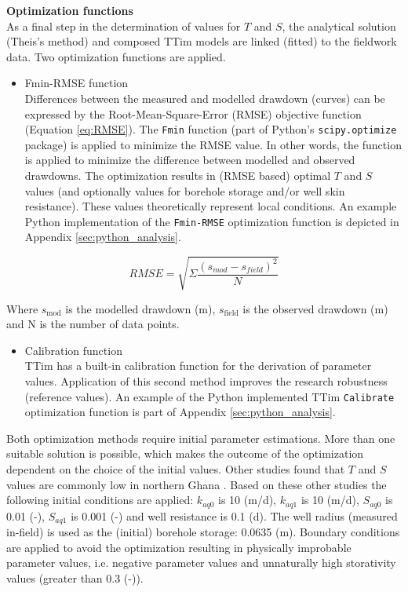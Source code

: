 \textbf{Optimization functions} \\
As a final step in the determination of values for $T$ and $S$, the analytical solution (Theis's method) and composed TTim models are linked (fitted) to the fieldwork data. Two optimization functions are applied.

\begin{itemize}
\item{Fmin-RMSE function} \\
Differences between the measured and modelled drawdown (curves) can be expressed by the Root-Mean-Square-Error (RMSE) objective function (Equation \ref{eq:RMSE}). The \texttt{Fmin} function (part of Python's \texttt{scipy.optimize} package) is applied to minimize the RMSE value. In other words, the function is applied to minimize the difference between modelled and observed drawdowns. The optimization results in (RMSE based) optimal $T$ and $S$ values (and optionally values for borehole storage and/or well skin resistance). These values theoretically represent local conditions. An example Python implementation of the \texttt{Fmin-RMSE} optimization function is depicted in Appendix \ref{sec:python_analysis}. 
\end{itemize}

\begin{equation}
\label{eq:RMSE}
 RMSE = \sqrt{\Sigma\frac{(s_{mod}-s_{field})^{2}}{N}}
\end{equation}

Where $s_{\text{mod}}$ is the modelled drawdown (m), $s_{\text{field}}$ is the observed drawdown (m) and N is the number of data points. \\
 
\begin{itemize}
\item{Calibration function} \\
TTim has a built-in calibration function for the derivation of parameter values. Application of this second method improves the research robustness (reference values). An example of the Python implemented TTim \texttt{Calibrate} optimization function is part of Appendix \ref{sec:python_analysis}. \\
\end{itemize}

Both optimization methods require initial parameter estimations. More than one suitable solution is possible, which makes the outcome of the optimization dependent on the choice of the initial values. Other studies found that $T$ and $S$ values are commonly low in northern Ghana \citep[e.g.][]{Owusu2015,Owusu2017}. Based on these other studies the following initial conditions are applied: $k_{aq0}$ is 10 (m/d), $k_{aq1}$ is 10 (m/d), $S_{aq0}$ is 0.01 (-), $S_{aq1}$ is 0.001 (-) and well resistance is 0.1 (d). The well radius (measured in-field) is used as the (initial) borehole storage: 0.0635 (m). Boundary conditions are applied to avoid the optimization resulting in physically improbable parameter values, i.e. negative parameter values and unnaturally high storativity values (greater than 0.3 (-)). \\

